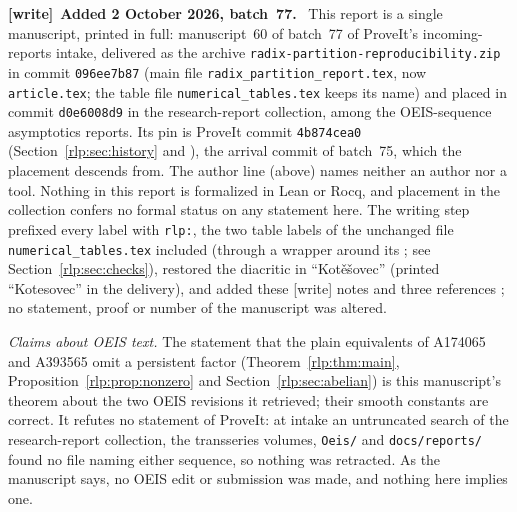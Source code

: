 \documentclass[11pt,letterpaper]{article}
\numberwithin{equation}{section}
\theoremstyle{remark}\newtheorem{remark}[theorem]{Remark}
\newenvironment{writenote}[1][]{\par\smallskip\begingroup\small
 \noindent\textbf{[write]}\if\relax\detokenize{#1}\relax\else~\textbf{#1.}\fi\ }%
 {\par\endgroup\smallskip}
\begin{document}
\begin{writenote}[Added 2 October 2026, batch~77]
This report is a single manuscript, printed in full: manuscript~60 of
batch~77 of ProveIt's incoming-reports intake, delivered as the archive
\texttt{radix-\allowbreak partition-\allowbreak reproducibility.zip} in commit
\texttt{096ee7b87} (main file \texttt{radix\_\allowbreak partition\_\allowbreak report.tex},
now \texttt{article.tex}; the table file \texttt{numerical\_\allowbreak tables.tex}
keeps its name) and placed in commit \texttt{d0e6008d9} in the
research-report collection, among the OEIS-sequence asymptotics reports. Its
pin is ProveIt commit \texttt{4b874cea0} (Section~\ref{rlp:sec:history} and
\cite{proveit}), the arrival commit of batch~75, which the placement
descends from. The author line (above) names neither an author nor a tool.
Nothing in this report is formalized in Lean or Rocq, and placement in the
collection confers no formal status on any statement here. The writing step
prefixed every label with \texttt{rlp:}, the two table labels of the
unchanged file \texttt{numerical\_tables.tex} included (through a wrapper
around its \verb||; see Section~\ref{rlp:sec:checks}), restored the
diacritic in ``Kot\v{e}\v{s}ovec'' (printed ``Kotesovec'' in the delivery),
and added these \textsf{[write]} notes and three references
\cite{rlp-tai,rlp-a033552,rlp-fabius}; no statement, proof or number of the
manuscript was altered.

\emph{Claims about OEIS text.} The statement that the plain equivalents of
A174065 and A393565 omit a persistent factor (Theorem~\ref{rlp:thm:main},
Proposition~\ref{rlp:prop:nonzero} and Section~\ref{rlp:sec:abelian}) is
this manuscript's theorem about the two OEIS revisions it retrieved; their
smooth constants are correct. It refutes no statement of ProveIt: at intake
an untruncated search of the research-report collection, the transseries
volumes, \texttt{Oeis/} and \texttt{docs/reports/} found no file naming
either sequence, so nothing was retracted. As the manuscript says, no OEIS
edit or submission was made, and nothing here implies one.


\end{writenote}
\end{document}
